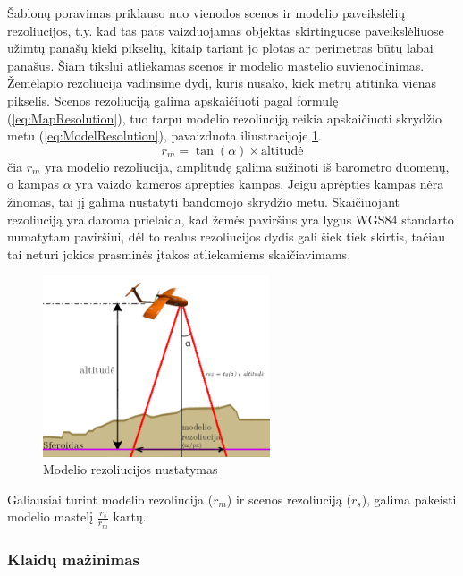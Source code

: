 \documentclass[a4paper,12pt]{article}
\begin{document}
			Šablonų poravimas priklauso nuo vienodos scenos ir modelio paveikslėlių rezoliucijos, t.y. kad tas pats vaizduojamas objektas skirtinguose paveikslėliuose užimtų panašų kieki pikselių, kitaip tariant jo plotas ar perimetras būtų labai panašus. Šiam tikslui atliekamas scenos ir modelio mastelio suvienodinimas. Žemėlapio rezoliucija vadinsime dydį, kuris nusako, kiek metrų atitinka vienas pikselis. Scenos rezoliuciją galima apskaičiuoti pagal formulę (\ref{eq:MapResolution}), tuo tarpu modelio rezoliuciją reikia apskaičiuoti skrydžio metu (\ref{eq:ModelResolution}), pavaizduota iliustracijoje \ref{fig:ModelResolution}.
			\begin{equation}
				r_m = \tan({\alpha}) \times \text{altitudė}
				\label{eq:ModelResolution}
			\end{equation}		
			čia $r_m$ yra modelio rezoliucija, amplitudę galima sužinoti iš barometro duomenų, o kampas $\alpha$ yra vaizdo kameros aprėpties kampas. Jeigu aprėpties kampas nėra žinomas, tai jį galima nustatyti bandomojo skrydžio metu. Skaičiuojant rezoliuciją yra daroma prielaida, kad žemės paviršius yra lygus \gls{WGS84} standarto numatytam paviršiui, dėl to realus rezoliucijos dydis gali šiek tiek skirtis, tačiau tai neturi jokios prasminės įtakos atliekamiems skaičiavimams.
			
			\begin{figure}[H]
				\centering
				\includegraphics[width=0.6\textwidth]{images/ModelResolution.png}
				\caption{Modelio rezoliucijos nustatymas}
				\label{fig:ModelResolution}
			\end{figure}
			
			Galiausiai turint modelio rezoliucija ($r_m$) ir scenos rezoliuciją ($r_s$), galima pakeisti modelio mastelį $\frac{r_s}{r_m}$ kartų.
		
			\subsubsection{Klaidų mažinimas}
			\label{sec:MinimizeMistakes}
			
\end{document}
